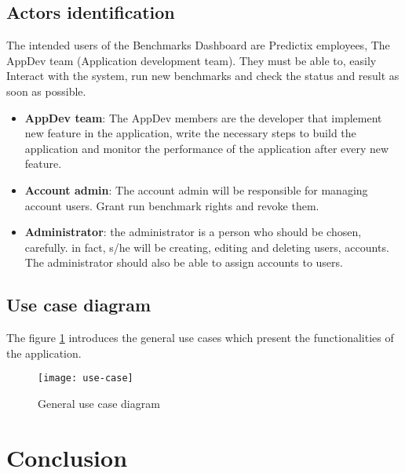 \subsection{Actors identification}
The intended users of the Benchmarks Dashboard are Predictix employees, The
AppDev team (Application development team). They must be able to, easily
Interact with the system, run new benchmarks and check the status and result as
soon as possible.

\begin{itemize}
  \item{\textbf{AppDev team}}: The AppDev members are the developer that implement new
    feature in the application, write the necessary steps to build the
    application and monitor the performance of the application after every new
    feature.
  \item{\textbf{Account admin}}: The account admin will be responsible for managing
    account users. Grant run benchmark rights and revoke them.
  \item{\textbf{Administrator}}: the administrator is a person who should be chosen,
    carefully. in fact, s/he will be creating, editing and deleting users,
    accounts. The administrator should also be able to assign accounts to users.
\end{itemize}

\subsection{Use case diagram}
The figure \hyperref[fig:use-case]{\ref{fig:use-case}} introduces the general use cases which present the
functionalities of the application.

\begin{figure}[h]
  \center
  \texttt{[image: use-case]}
  \caption{General use case diagram}
\label{fig:use-case}
\end{figure}


\section*{Conclusion}
